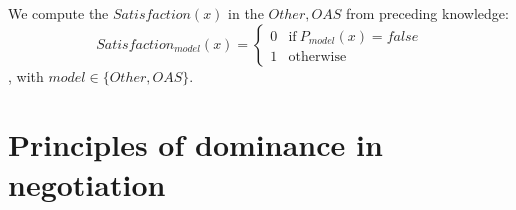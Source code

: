 \documentclass{article}
\begin{document}
	
	We compute the $Satisfaction(x)$ in the $Other, OAS$ from preceding knowledge:
		$$Satisfaction_{model}(x) = \left\{\begin{array}{ll}
			0 & \mathrm{if\ }P_{model}(x)= false\\
			1 & \mathrm{otherwise}
			\end{array}\right.$$, with $ model \in \{Other, OAS\}$.
	
	
	
	\section{Principles of dominance in negotiation}
	
\end{document}
